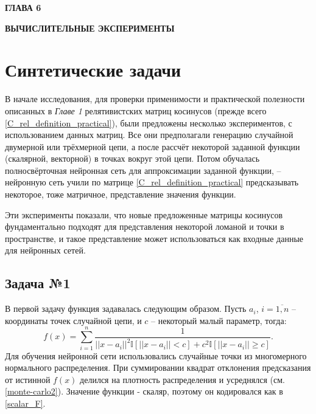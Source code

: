 \newpage
\begin{center}
	\textbf{\large ГЛАВА 6}

	\textbf{\large ВЫЧИСЛИТЕЛЬНЫЕ ЭКСПЕРИМЕНТЫ}
\end{center}

\section{Синтетические задачи}

В начале исследования, для проверки применимости и практической полезности описанных в \textit{Главе 1} релятивистских матриц косинусов (прежде всего \ref{C_rel_definition_practical}), были предложены несколько экспериментов, с использованием данных матриц. Все они предполагали генерацию случайной двумерной или трёхмерной цепи, а после рассчёт некоторой заданной функции (скалярной, векторной) в точках вокруг этой цепи. Потом обучалась полносвёрточная нейронная сеть для аппроксимации заданной функции, -- нейронную сеть учили по матрице \ref{C_rel_definition_practical} предсказывать некоторое, тоже матричное, представление значения функции.

Эти эксперименты показали, что новые предложенные матрицы косинусов фундаментально подходят для представления некоторой ломаной и точки в пространстве, и такое представление может использоваться как входные данные для нейронных сетей.

\subsection{Задача №1}
В первой задачу функция задавалась следующим образом. Пусть $a_i$, $i=\overline{1,n}$ -- координаты точек случайной цепи, и $c$ -- некоторый малый параметр, тогда:
\begin{equation}
	f(x) = \sum_{i=1}^n\frac{1}{||x - a_i||^2\mathbb{I}[||x - a_i|| < c] + c^2\mathbb{I}[||x - a_i|| \ge c]}.
	\label{synt1_f}
\end{equation}
Для обучения нейронной сети использовались случайные точки из многомерного нормального распределения. При суммировании квадрат отклонения предсказания от истинной $f(x)$ делился на плотность распределения и усреднялся (см. \ref{monte-carlo2}). Значение функции - скаляр, поэтому он кодировался как в \ref{scalar_F}.

